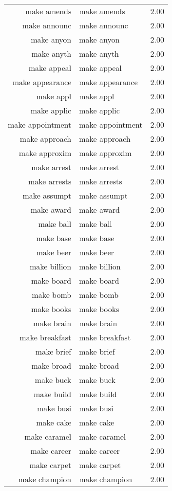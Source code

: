 \begin{table}[ht]
\begin{tabular}{rlr}
  make amends & make amends & 2.00 \\ 
  make announc & make announc & 2.00 \\ 
  make anyon & make anyon & 2.00 \\ 
  make anyth & make anyth & 2.00 \\ 
  make appeal & make appeal & 2.00 \\ 
  make appearance & make appearance & 2.00 \\ 
  make appl & make appl & 2.00 \\ 
  make applic & make applic & 2.00 \\ 
  make appointment & make appointment & 2.00 \\ 
  make approach & make approach & 2.00 \\ 
  make approxim & make approxim & 2.00 \\ 
  make arrest & make arrest & 2.00 \\ 
  make arrests & make arrests & 2.00 \\ 
  make assumpt & make assumpt & 2.00 \\ 
  make award & make award & 2.00 \\ 
  make ball & make ball & 2.00 \\ 
  make base & make base & 2.00 \\ 
  make beer & make beer & 2.00 \\ 
  make billion & make billion & 2.00 \\ 
  make board & make board & 2.00 \\ 
  make bomb & make bomb & 2.00 \\ 
  make books & make books & 2.00 \\ 
  make brain & make brain & 2.00 \\ 
  make breakfast & make breakfast & 2.00 \\ 
  make brief & make brief & 2.00 \\ 
  make broad & make broad & 2.00 \\ 
  make buck & make buck & 2.00 \\ 
  make build & make build & 2.00 \\ 
  make busi & make busi & 2.00 \\ 
  make cake & make cake & 2.00 \\ 
  make caramel & make caramel & 2.00 \\ 
  make career & make career & 2.00 \\ 
  make carpet & make carpet & 2.00 \\ 
  make champion & make champion & 2.00 \\ 

\end{tabular}
\end{table}
